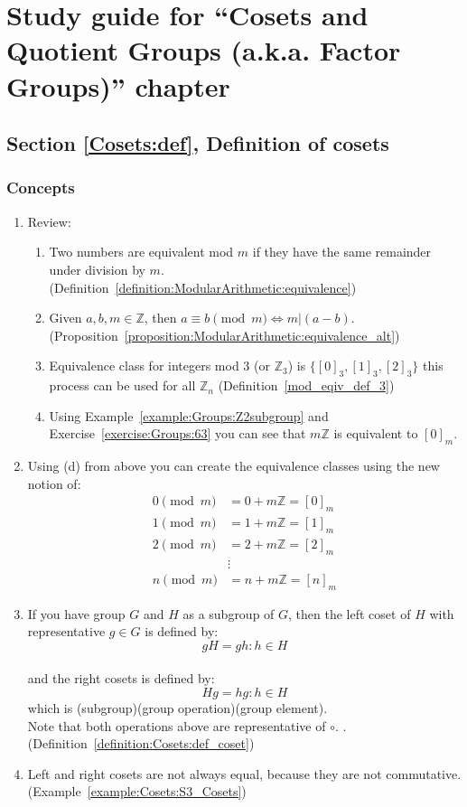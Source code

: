 \section{Study guide  for ``Cosets and Quotient Groups (a.k.a. Factor Groups)''  chapter}
\label{sec:Cosets:study} 


\subsection*{Section \ref{Cosets:def}, Definition of cosets}
\subsubsection*{Concepts}
\begin{enumerate}
\item 
Review:
	\begin{enumerate}
	\item
	Two numbers are equivalent mod $m$ if they have the same remainder under division by $m$. (Definition~\ref{definition:ModularArithmetic:equivalence})
	\item
	Given $a, b, m \in {\mathbb Z}$, then $a \equiv b \pmod{m} \iff m | (a - b)$. (Proposition~\ref{proposition:ModularArithmetic:equivalence_alt})
	\item
	Equivalence class for integers mod 3 (or ${\mathbb Z}_3$) is $\{ [0]_3, [1]_3, [2]_3 \}$ this process can be used for all ${\mathbb Z}_n$ (Definition~\ref{mod_eqiv_def_3})
	\item
	Using Example~\ref{example:Groups:Z2subgroup} and Exercise~\ref{exercise:Groups:63} you can see that $m{\mathbb Z}$ is equivalent to  $[0]_m$.
	\end{enumerate}
	
\item
Using (d) from above you can create the equivalence classes using the new notion of:
	\begin{align*}
	0 \pmod{m} &= 0 + m{\mathbb Z} = [0]_m
	\\
	1 \pmod{m} &= 1 + m{\mathbb Z} = [1]_m
	\\
	2 \pmod{m} &= 2 + m{\mathbb Z} =  [2]_m
	\\
	&\vdots
	\\
	n \pmod{m} &= n + m{\mathbb Z} =  [n]_m
	\end{align*}

\item
If you have group $G$ and $H$ as a subgroup of $G$, then the left coset of $H$ with representative $g \in G$ is defined by:
\\
$$gH = {gh:h \in H}$$
\\
and the right cosets is defined by:
\\
$$Hg = {hg:h \in H}$$
which is (subgroup)(group operation)(group element).
\\
Note that both operations above are representative of $\circ$. . (Definition~\ref{definition:Cosets:def_coset})

\item
Left and right cosets are not always equal, because they are not commutative. (Example~\ref{example:Cosets:S3_Cosets})
\end{enumerate}

